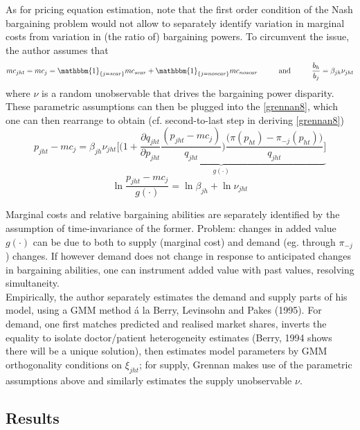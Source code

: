 \documentclass[11pt]{article}
\numberwithin{equation}{section}
\begin{document}
As for pricing equation estimation, note that the first order condition of the Nash bargaining problem would not allow to separately identify variation in marginal costs from variation in (the ratio of) bargaining powers. To circumvent the issue, the author assumes that
\begin{equation}
	mc_{jht} = mc_j = \mathbbm{1}_{\{j = scar\}}mc_{scar} + \mathbbm{1}_{\{j = noscar\}}mc_{noscar} \hspace{1cm} \text{and} \hspace{1cm} \frac{b_h}{b_j} = \beta_{jh}\nu_{jht}
\end{equation}
where $\nu$ is a random unobservable that drives the bargaining power disparity. These parametric assumptions can then be plugged into the \eqref{grennan8}, which one can then rearrange to obtain (cf. second-to-last step in deriving \eqref{grennan8})
\begin{equation}
	p_{jht} - mc_j = \beta_{jh}\nu_{jht} \underbrace{\bigg[\bigg( 1 + \frac{\partial q_{jht}}{\partial p_{jht}} \frac{(p_{jht} - mc_{j})}{q_{jht}} \bigg) \frac{ \big(\pi(p_{ht}) - \pi_{-j} (p_{ht})\big)}{q_{jht}}\bigg]}_{g(\cdot)}
\end{equation}
\begin{equation}
	\ln \frac{p_{jht} - mc_j}{g(\cdot)} = \ln \beta_{jh} + \ln \nu_{jht}
\end{equation}

Marginal costs and relative bargaining abilities are separately identified by the assumption of time-invariance of the former. Problem: changes in added value $g(\cdot)$ can be due to both to supply (marginal cost) and demand (eg. through $\pi_{-j}$) changes. If however demand does not change in response to anticipated changes in bargaining abilities, one can instrument added value with past values, resolving simultaneity. \\

Empirically, the author separately estimates the demand and supply parts of his model, using a GMM method \'{a} la Berry, Levinsohn and Pakes (1995).
For demand, one first matches predicted and realised market shares, inverts the equality to isolate doctor/patient heterogeneity estimates (Berry, 1994 shows there will be a unique solution), then estimates model parameters by GMM orthogonality conditions on $\xi_{jht}$; for supply, Grennan makes use of the parametric assumptions above and similarly estimates the supply unobservable $\nu$.

\subsection{Results}
\end{document}
